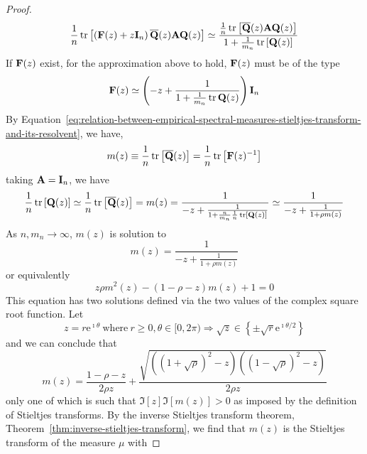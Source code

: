 \begin{proof}
	\begin{equation*}
		\frac{1}{n}\operatorname{tr}\left[\left(\mathbf{F}(z)+z\mathbf{I}_{n}\right)\overline{\mathbf{Q}}(z)\mathbf{A}\mathbf{Q}(z)\right]\simeq\frac{\frac{1}{n}\operatorname{tr}\left[\overline{\mathbf{Q}}(z)\mathbf{A}\mathbf{Q}(z)\right]}{1+\frac{1}{m_{n}}\operatorname{tr}\left[\mathbf{Q}(z)\right]}
	\end{equation*}
	If \(\mathbf{F}(z)\) exist, for the approximation above to hold, \(\mathbf{F}(z)\) must be of the type
	\begin{equation*}
		\mathbf{F}(z)\simeq\left(-z+\frac{1}{1+\frac{1}{m_{n}}\operatorname{tr}\mathbf{Q}(z)}\right)\mathbf{I}_{n}
	\end{equation*}
	By Equation~\ref{eq:relation-between-empirical-spectral-measures-stieltjes-transform-and-its-resolvent}, we have,
	\begin{equation*}
		m(z)\equiv\frac{1}{n}\operatorname{tr}\left[\overline{\mathbf{Q}}(z)\right]=\frac{1}{n}\operatorname{tr}\left[\mathbf{F}(z)^{-1}\right]
	\end{equation*}
	taking \(\mathbf{A}=\mathbf{I}_{n}\), we have
	\begin{equation*}
		\frac{1}{n}\operatorname{tr}\left[\mathbf{Q}(z)\right]\simeq\frac{1}{n}\operatorname{tr}\left[\overline{\mathbf{Q}}(z)\right]=m(z)=\frac{1}{-z+\frac{1}{1+\frac{n}{m_{n}}\frac{1}{n}\operatorname{tr}\left[\mathbf{Q}(z)\right]}}\simeq\frac{1}{-z+\frac{1}{1+\rho m(z)}}
	\end{equation*}
	As \(n,m_{n}\rightarrow\infty\), \(m(z)\) is solution to
	\begin{equation*}
		m(z)=\frac{1}{-z+\frac{1}{1+\rho m(z)}}
	\end{equation*}
	or equivalently
	\begin{equation*}
		z\rho m^{2}(z)-(1-\rho-z)m(z)+1=0
	\end{equation*}
	This equation has two solutions defined via the two values of the complex square root function. Let
	\begin{equation*}
		z=r\mathrm{e}^{\imath\theta}\ \text{where}\ r\geq 0,\theta\in[0,2\pi)\Rightarrow\sqrt{z}\in\left\{\pm\sqrt{r}\mathrm{e}^{\imath\theta/2}\right\}
	\end{equation*}
	and we can conclude that
	\begin{equation*}
		m(z)=\frac{1-\rho-z}{2\rho z}+\frac{\sqrt{\left((1+\sqrt{\rho})^{2}-z\right)\left((1-\sqrt{\rho})^{2}-z\right)}}{2\rho z}
	\end{equation*}
	only one of which is such that \(\Im[z]\Im[m(z)]>0\) as imposed by the definition of Stieltjes transforms. By the inverse Stieltjes transform theorem, Theorem~\ref{thm:inverse-stieltjes-transform}, we find that \(m(z)\) is the Stieltjes transform of the measure \(\mu\) with

\end{proof}
